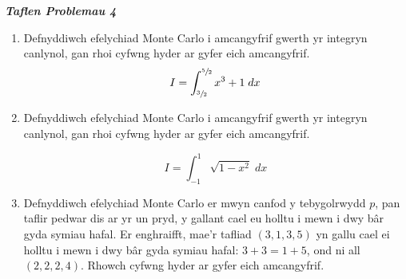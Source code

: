 \documentclass[12pt]{article}
\begin{document}
\pagestyle{fancy}
\fancyhead{}
\fancyfoot{}
\fancyfoot[R]{\thepage}


\begin{center}
\LARGE{\textbf{\textit{Taflen Problemau 4}}}
\end{center}

\vspace{10mm}

\begin{enumerate}
  \item Defnyddiwch efelychiad Monte Carlo i amcangyfrif gwerth yr integryn canlynol, gan rhoi cyfwng hyder ar gyfer eich amcangyfrif.
  \begin{equation*}
  I = \displaystyle{\int_{\sfrac{3}{2}}^{\sfrac{5}{2}} x^3 + 1 \; dx}
  \end{equation*}

  \vspace{10mm}

  \item Defnyddiwch efelychiad Monte Carlo i amcangyfrif gwerth yr integryn canlynol, gan rhoi cyfwng hyder ar gyfer eich amcangyfrif.

  \begin{equation*}
  I = \displaystyle{\int_{-1}^1 \sqrt{1 - x^2} \; dx}
  \end{equation*}

  \item Defnyddiwch efelychiad Monte Carlo er mwyn canfod y tebygolrwydd $p$, pan taflir pedwar dis ar yr un pryd, y gallant cael eu holltu i mewn i dwy bâr gyda symiau hafal. Er enghraifft, mae'r tafliad $(3, 1, 3, 5)$ yn gallu cael ei holltu i mewn i dwy bâr gyda symiau hafal: $3 + 3 = 1 + 5$, ond ni all $(2, 2, 2, 4)$. Rhowch cyfwng hyder ar gyfer eich amcangyfrif.

  \vspace{10mm}


\end{enumerate}
\end{document}
